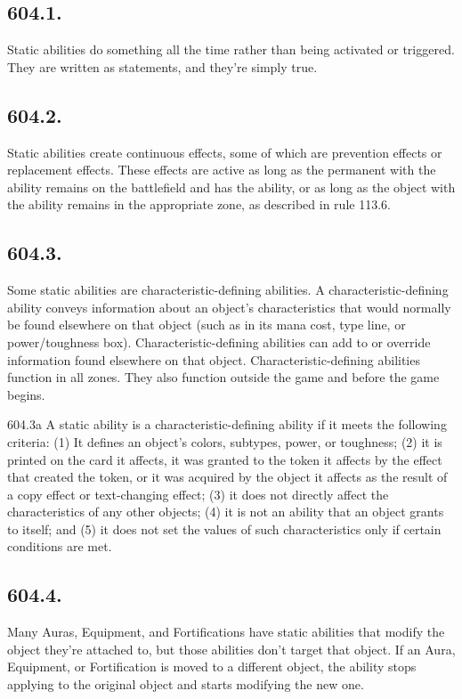 \subsection*{604.1.}
Static abilities do something all the time rather than being activated or triggered. They are written as statements, and they’re simply true.

\subsection*{604.2.}
Static abilities create continuous effects, some of which are prevention effects or replacement effects. These effects are active as long as the permanent with the ability remains on the battlefield and has the ability, or as long as the object with the ability remains in the appropriate zone, as described in rule 113.6.

\subsection*{604.3.}
Some static abilities are characteristic-defining abilities. A characteristic-defining ability conveys information about an object’s characteristics that would normally be found elsewhere on that object (such as in its mana cost, type line, or power/toughness box). Characteristic-defining abilities can add to or override information found elsewhere on that object. Characteristic-defining abilities function in all zones. They also function outside the game and before the game begins.

604.3a A static ability is a characteristic-defining ability if it meets the following criteria: (1) It defines an object’s colors, subtypes, power, or toughness; (2) it is printed on the card it affects, it was granted to the token it affects by the effect that created the token, or it was acquired by the object it affects as the result of a copy effect or text-changing effect; (3) it does not directly affect the characteristics of any other objects; (4) it is not an ability that an object grants to itself; and (5) it does not set the values of such characteristics only if certain conditions are met.

\subsection*{604.4.}
Many Auras, Equipment, and Fortifications have static abilities that modify the object they’re attached to, but those abilities don’t target that object. If an Aura, Equipment, or Fortification is moved to a different object, the ability stops applying to the original object and starts modifying the new one.

